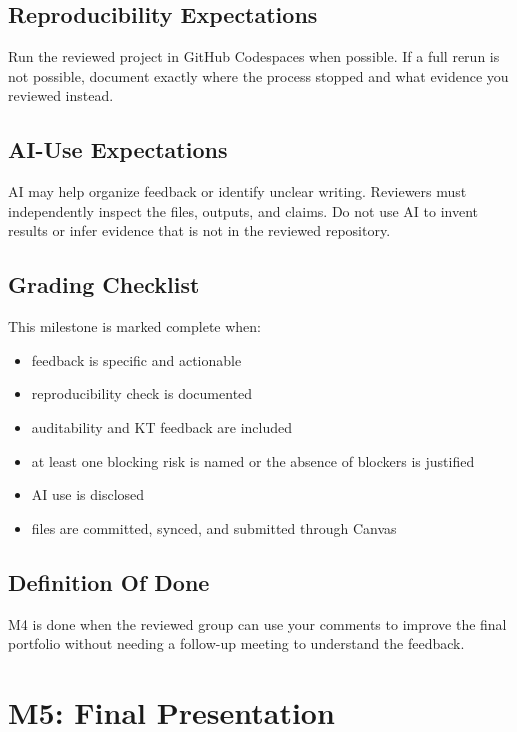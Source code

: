 \documentclass[
  letterpaper,
  DIV=11,
  numbers=noendperiod,
  oneside]{scrreprt}
\providecommand{\tightlist}{%
  \setlength{\itemsep}{0pt}\setlength{\parskip}{0pt}}
\begin{document}
\section{Reproducibility
Expectations}\label{reproducibility-expectations-6}

Run the reviewed project in GitHub Codespaces when possible. If a full
rerun is not possible, document exactly where the process stopped and
what evidence you reviewed instead.

\section{AI-Use Expectations}\label{ai-use-expectations-5}

AI may help organize feedback or identify unclear writing. Reviewers
must independently inspect the files, outputs, and claims. Do not use AI
to invent results or infer evidence that is not in the reviewed
repository.

\section{Grading Checklist}\label{grading-checklist-4}

This milestone is marked complete when:

\begin{itemize}
\tightlist
\item
  feedback is specific and actionable
\item
  reproducibility check is documented
\item
  auditability and KT feedback are included
\item
  at least one blocking risk is named or the absence of blockers is
  justified
\item
  AI use is disclosed
\item
  files are committed, synced, and submitted through Canvas
\end{itemize}

\section{Definition Of Done}\label{definition-of-done-7}

M4 is done when the reviewed group can use your comments to improve the
final portfolio without needing a follow-up meeting to understand the
feedback.

\chapter{M5: Final Presentation}\label{m5-final-presentation}
\end{document}
